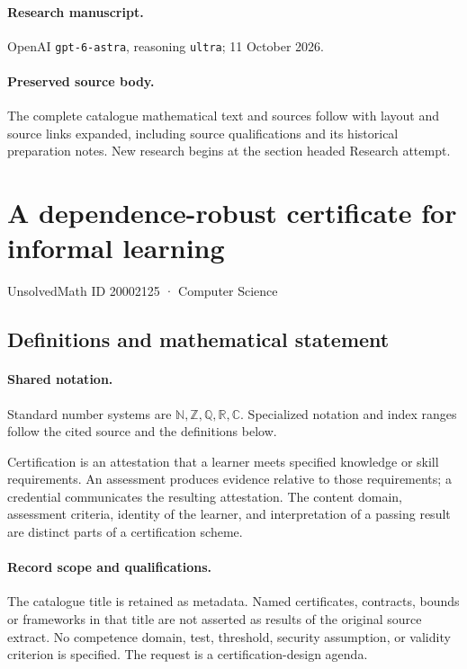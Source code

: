 \documentclass[11pt]{article}
\begin{document}
\paragraph{Research manuscript.} OpenAI \texttt{gpt-6-astra}, reasoning \texttt{ultra}; 11 October 2026.
\paragraph{Preserved source body.} The complete catalogue mathematical text and sources follow with layout and source links expanded, including source qualifications and its historical preparation notes. New research begins at the section headed Research attempt.

\section{A dependence-robust certificate for informal learning}\label{20002125}
{\small UnsolvedMath ID 20002125 · Computer Science}
\subsection{Definitions and mathematical statement}

\paragraph{Shared notation.}Standard number systems are $\mathbb N,\mathbb Z,\mathbb Q,\mathbb R,\mathbb C$. Specialized notation and index ranges follow the cited source and the definitions below.


Certification is an attestation that a learner meets specified knowledge or skill requirements. An assessment produces evidence relative to those requirements; a credential communicates the resulting attestation. The content domain, assessment criteria, identity of the learner, and interpretation of a passing result are distinct parts of a certification scheme.
\paragraph{Record scope and qualifications.}
The catalogue title is retained as metadata. Named certificates, contracts, bounds or frameworks in that title are not asserted as results of the original source extract.
No competence domain, test, threshold, security assumption, or validity criterion is specified. The request is a certification-design agenda.
\end{document}
